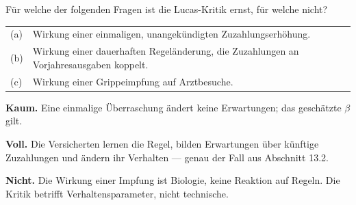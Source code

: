 \begin{aufgabe}
Für welche der folgenden Fragen ist die Lucas-Kritik ernst, für welche nicht?
\begin{center}
{\small
\renewcommand{\arraystretch}{1.5}
\begin{tabular}{@{}P{1.0cm}P{7.4cm}@{}}
\toprule
(a) & Wirkung einer einmaligen, unangekündigten Zuzahlungserhöhung.\\
(b) & Wirkung einer dauerhaften Regeländerung, die Zuzahlungen an Vorjahresausgaben koppelt.\\
(c) & Wirkung einer Grippeimpfung auf Arztbesuche.\\
\bottomrule
\end{tabular}}
\end{center}

\loesung
{}
\begin{center}
\begin{minipage}{0.9\textwidth}
\textbf{Kaum.} Eine einmalige Überraschung ändert keine Erwartungen; das geschätzte $\beta$ gilt.
\end{minipage}
\end{center}

\begin{center}
\begin{minipage}{0.9\textwidth}
\textbf{Voll.} Die Versicherten lernen die Regel, bilden Erwartungen über künftige Zuzahlungen und ändern ihr Verhalten --- genau der Fall aus Abschnitt 13.2.
\end{minipage}
\end{center}

\begin{center}
\begin{minipage}{0.9\textwidth}
\textbf{Nicht.} Die Wirkung einer Impfung ist Biologie, keine Reaktion auf Regeln. Die Kritik betrifft Verhaltensparameter, nicht technische.
\end{minipage}
\end{center}

\begin{center}
\begin{minipage}{0.88\textwidth}
\end{minipage}
\end{center}
\end{aufgabe}

